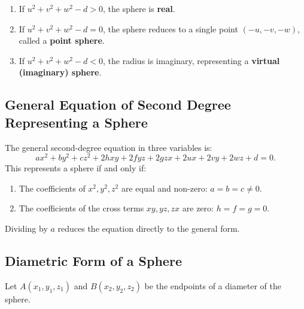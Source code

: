 \begin{conceptbox}
\begin{enumerate}[noitemsep]
    \item If $u^2 + v^2 + w^2 - d > 0$, the sphere is \textbf{real}.
    \item If $u^2 + v^2 + w^2 - d = 0$, the sphere reduces to a single point $(-u, -v, -w)$, called a \textbf{point sphere}.
    \item If $u^2 + v^2 + w^2 - d < 0$, the radius is imaginary, representing a \textbf{virtual (imaginary) sphere}.
\end{enumerate}
\end{conceptbox}

\subsection{General Equation of Second Degree Representing a Sphere}
The general second-degree equation in three variables is:
\begin{equation}
    ax^2 + by^2 + cz^2 + 2hxy + 2fyz + 2gzx + 2ux + 2vy + 2wz + d = 0.
\end{equation}
This represents a sphere if and only if:
\begin{enumerate}[noitemsep]
    \item The coefficients of $x^2, y^2, z^2$ are equal and non-zero: $a = b = c \neq 0$.
    \item The coefficients of the cross terms $xy, yz, zx$ are zero: $h = f = g = 0$.
\end{enumerate}
Dividing by $a$ reduces the equation directly to the general form.

\subsection{Diametric Form of a Sphere}
Let $A(x_1, y_1, z_1)$ and $B(x_2, y_2, z_2)$ be the endpoints of a diameter of the sphere.

\begin{center}
\end{center}

